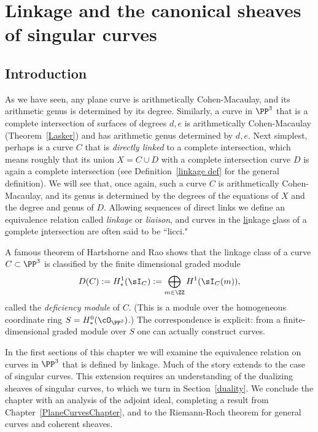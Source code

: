 

\chapter{Linkage and the canonical sheaves of singular curves}
\label{LiaisonChapter}\label{linkageChapter}\label{LinkageChapter}


\section{Introduction} \label{LinkageIntro}


As we have seen, any plane curve is arithmetically Cohen-Macaulay, and its arithmetic genus is determined by its degree. Similarly, a curve in  $\PP^3$ that is a complete intersection of surfaces of degrees $d,e$
is arithmetically Cohen-Macaulay (Theorem~\ref{Lasker}) and has arithmetic genus determined by $d,e$.
 Next simplest, perhaps
is a curve $C$ that is \emph{directly linked} to a complete intersection, which means roughly that its union $X = C\cup D$
with a complete intersection
curve $D$ is again a complete intersection (see Definition~\ref{linkage def} for the general definition). We will see that, once again, such a curve $C$ is arithmetically Cohen-Macaulay,
and its genus is determined by the degrees of the equations of $X$ and the degree and genus of $D$. 
Allowing sequences of direct links we define an equivalence relation called  \emph{linkage} or \emph{liaison}, 
and curves in the \underline{li}nkage {\underline c}lass of a {\underline c}omplete {\underline i}ntersection are often said to be ``licci." 

A famous theorem of Hartshorne and Rao \cite{MR520926} shows that the linkage class of a curve $C\subset \PP^3$
is classified by the finite dimensional graded module 
$$
D(C) :=H^1_*(\sI_C):=\bigoplus_{m\in \ZZ} H^1(\sI_C(m)),
$$
called the \emph{deficiency module} of $C$. (This is a module over the homogeneous coordinate ring $S = H^0_*(\cO_{\PP^3})$.) The correspondence is explicit: from a finite-dimensional graded module over $S$ one can
actually construct curves.

In the first sections of this chapter we will examine the equivalence relation on curves in $\PP^3$ that is defined by linkage. Much of the story extends to the case of singular curves. This extension requires an understanding of the
dualizing sheaves of singular curves, to which we turn in Section~\ref{duality}. We conclude the chapter with an analysis of the adjoint ideal, completing a result from Chapter~\ref{PlaneCurvesChapter},  and to the Riemann-Roch theorem for general curves and coherent sheaves.

